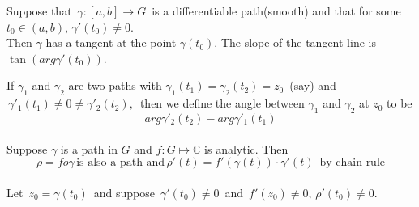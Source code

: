\documentclass[11pt,a4paper]{article}
\theoremstyle{definition}
\begin{document}
Suppose that $\, \gamma: [a,b] \longrightarrow G\,$ is a differentiable path(smooth) and that for some\\ $t_0 \in (a,b),\, \gamma'(t_0) \neq 0$.\\

Then $\gamma$ has a tangent at the point $\gamma (t_0)$. The slope of the tangent line is $\tan (arg\gamma'(t_0))$.



\begin{figure}[H]
\centering
{}
\end{figure}














If $\gamma_1$ and $\gamma_2$ are two paths with $\gamma_1(t_1) = \gamma_2 (t_2)  = z_0\,$ (say) and $\, \gamma'_1 (t_1) \neq 0 \neq \gamma'_2(t_2),\,$ then we define the angle between $\gamma_1$ and $\gamma_2$ at $z_0$ to be 
$$\boxed{arg\gamma'_2(t_2) - arg\gamma'_1(t_1)}$$\\




















Suppose $\gamma$ is a path in $G$ and $f: G \longmapsto \mathbb{C}$ is analytic. Then\\
$$\boxed{
\rho = fo\gamma\, \text{is also a path and} \, \rho'(t) = f'(\gamma(t))\cdot \gamma'(t)\,\text{ by chain rule}}$$\\


Let $\, z_0 = \gamma (t_0)\,$ and suppose $\, \gamma'(t_0) \neq 0\,$ and $\, f'(z_0) \neq 0,\, \rho'(t_0) \neq 0$.
\end{document}
